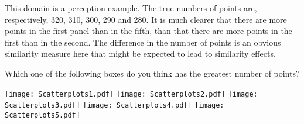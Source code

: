 This domain is a perception example.
The true numbers of points are, respectively, 320, 310, 300, 290 and 280.
It is much clearer that there are more points in the first panel than in the fifth, than that there are more points in the first than in the second.
The difference in the number of points is an obvious similarity measure here that might be expected to lead to similarity effects.
{}
\begin{tcolorbox}
Which one of the following boxes do you think has the greatest number of points?

\texttt{[image: Scatterplots1.pdf]}
\texttt{[image: Scatterplots2.pdf]}
\texttt{[image: Scatterplots3.pdf]}
\texttt{[image: Scatterplots4.pdf]}
\texttt{[image: Scatterplots5.pdf]}
\end{tcolorbox}
